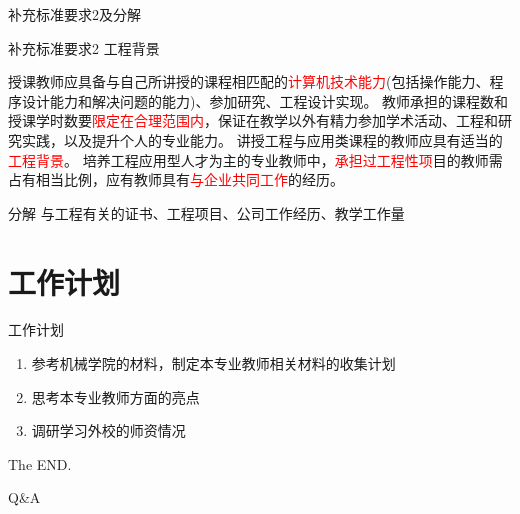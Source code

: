 \documentclass{beamer}
\begin{document}
\begin{frame}{补充标准要求2及分解}
\begin{block}{补充标准要求2}
工程背景

授课教师应具备与自己所讲授的课程相匹配的\textcolor{red}{计算机技术能力}(包括操作能力、程序设计能力和解决问题的能力)、参加研究、工程设计实现。
教师承担的课程数和授课学时数要\textcolor{red}{限定在合理范围内}，保证在教学以外有精力参加学术活动、工程和研究实践，以及提升个人的专业能力。
讲授工程与应用类课程的教师应具有适当的\textcolor{red}{工程背景}。
培养工程应用型人才为主的专业教师中，\textcolor{red}{承担过工程性项}目的教师需占有相当比例，应有教师具有\textcolor{red}{与企业共同工作}的经历。

\end{block}
\begin{block}{分解}
与工程有关的证书、工程项目、公司工作经历、教学工作量


\end{block}
\end{frame}
\section{工作计划}
{%
\begin{frame}{工作计划}
\begin{enumerate}
\item
参考机械学院的材料，制定本专业教师相关材料的收集计划
\item
思考本专业教师方面的亮点
\item
\alert{调研学习外校的师资情况}
\end{enumerate}

\end{frame}
}
\begin{frame}[standout]
The END.

Q\&A
\end{frame}
\end{document}
